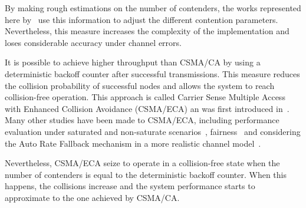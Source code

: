 By making rough estimations on the number of contenders, the works represented here by~\cite{cali2000dti,lopez-toledo2006aoi} use this information to adjust the different contention parameters. Nevertheless, this measure increases the complexity of the implementation and loses considerable accuracy under channel errors.

It is possible to achieve higher throughput than CSMA/CA by using a deterministic backoff counter after successful transmissions. This measure reduces the collision probability of successful nodes and allows the system to reach  collision-free operation. This approach is called Carrier Sense Multiple Access with Enhanced Collision Avoidance (CSMA/ECA) an was first introduced in~\cite{barcelo2008lba}. Many other studies have been made to CSMA/ECA, including performance evaluation under saturated and non-saturate scenarios~\cite{bellalta2009vtc}, fairness~\cite{he2009srb,barcelo2010fcc,fang2011dlm} and considering the Auto Rate Fallback mechanism in a more realistic channel model~\cite{martorell2012pec,martorell2012tfl}.

Nevertheless, CSMA/ECA seize to operate in a collision-free state when the number of contenders is equal to the deterministic backoff counter. When this happens, the collisions increase and the system performance starts to approximate to the one achieved by CSMA/CA.